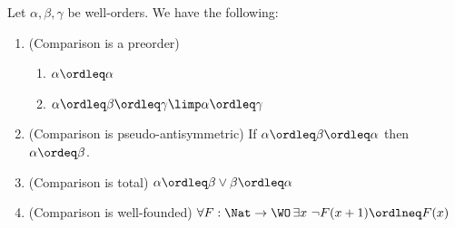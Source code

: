 \begin{proposition}
    \label{prop:ord-comparison-facts}
    Let $\alpha,\beta,\gamma$ be well-orders.
    We have the following:
    \begin{enumerate}
        \item\label{item:comparison-is-preorder} (Comparison is a preorder)
\begin{enumerate}
    \item $\alpha\ordleq \alpha$
    \item $\alpha \ordleq \beta \ordleq \gamma \limp \alpha \ordleq \gamma$
\end{enumerate}
\item\label{item:comparison-pseudo-antisymmetric} (Comparison is pseudo-antisymmetric) If $\alpha \ordleq \beta \ordleq \alpha $ then $\alpha \ordeq \beta$.
\item\label{item:comparison-total} (Comparison is total) 
$\alpha \ordleq \beta \lor \beta \ordleq \alpha$
\item\label{item:comparison-wf} (Comparison is well-founded)
$\forall F: \Nat\to \WO \,  \exists x\  \lnot F(x+1)\ordlneq F(x)$
    \end{enumerate}
\end{proposition}



